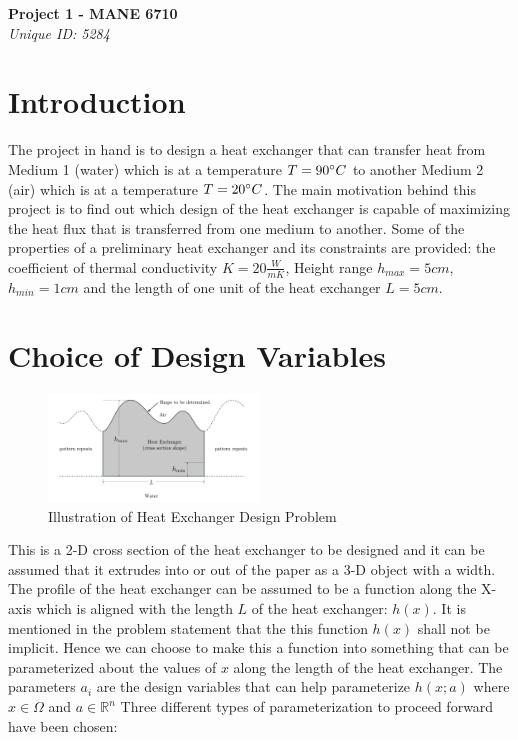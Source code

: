 \documentclass{article}
\begin{document}
\begin{center}
\textbf{\large{Project 1 - MANE 6710}} \\
\textit{Unique ID: 5284}
\end{center}
\noindent\makebox[\linewidth]{\rule{\paperwidth}{0.4pt}} 
\newline
\tableofcontents
\begin{appendix}
\listoffigures
\listoftables
\end{appendix}
\newpage
\section{Introduction}
The project in hand is to design a heat exchanger that can transfer heat from Medium 1 (water) which is at a temperature $T= 90\degree C$ to another Medium 2 (air) which is at a temperature $T= 20 \degree C$. The main motivation behind this project is to find out which design of the heat exchanger is capable of maximizing the heat flux that is transferred from one medium to another. Some of the properties of a preliminary heat exchanger and its constraints are provided: the coefficient of thermal conductivity $K = 20 \frac{W}{mK}$, Height range $h_{max}= 5cm$, $h_{min} = 1cm$ and the length of one unit of the heat exchanger $L=5cm$.
\section{Choice of Design Variables}
\begin{figure}[h]
	\centering
        \includegraphics[width=0.5\textwidth]{Question_Image}
        	\caption{Illustration of Heat Exchanger Design Problem}
\end{figure} 
This is a 2-D cross section of the heat exchanger to be designed and it can be assumed that it extrudes into or out of the paper as a 3-D object with a width. The profile of the heat exchanger can be assumed to be a function along the X-axis which is aligned with the length $L$ of the heat exchanger: $ h(x) $.
It is mentioned in the problem statement that the this function $h(x)$ shall not be implicit. Hence we can choose to make this a function into something that can be parameterized about the values of $x$ along the length of the heat exchanger. 
The parameters $a_i$ are the design variables that can help parameterize $h(x;a)$ where $x \in \Omega$  and $ a \in \mathbb{R}^n$ 
Three different types of parameterization to proceed forward have been chosen:
\end{document}
